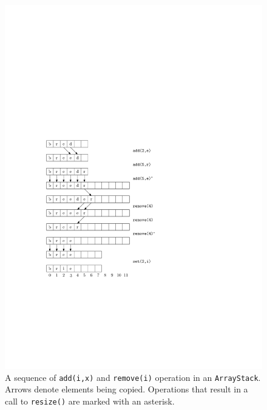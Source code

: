 \begin{figure}
  \begin{center}
    \includegraphics{figs/arraystack}
  \end{center}
  \caption{A sequence of \mbox{\texttt{add({\color{var}i},{\color{var}x})}} and \mbox{\texttt{remove({\color{var}i})}} operation in an
  \mbox{\texttt{ArrayStack}}.  Arrows denote elements being copied.  Operations that
  result in a call to \mbox{\texttt{resize()}} are marked with an asterisk.}
\end{figure}

